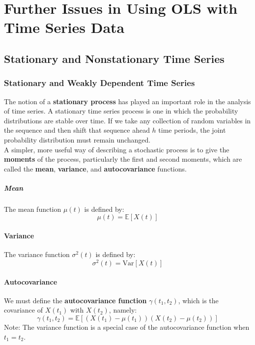 \documentclass[a4paper, 10pt]{article}
\theoremstyle{definition}	%
\begin{document}
\newpage

\section{Further Issues in Using OLS with Time Series Data}
\setcounter{equation}{0}
\setcounter{theorem}{0}
\setcounter{assumption}{0}

\subsection{Stationary and Nonstationary Time Series}
\subsubsection{Stationary and Weakly Dependent Time Series}
The notion of a \textbf{stationary process} has played an important role in the analysis of time series. A stationary time series process is one in which the probability distributions are stable over time. If we take any collection of random variables in the sequence and then shift that sequence ahead $h$ time periods, the joint probability distribution must remain unchanged.\\
A simpler, more useful way of describing a stochastic process is to give the \textbf{moments} of the process, particularly the first and second moments, which are called the \textbf{mean}, \textbf{variance}, and \textbf{autocovariance} functions.

\subparagraph{Mean} The mean function \( \mu(t) \) is defined by:
\begin{equation*}
    \mu(t) = \mathbb{E}[X(t)]
\end{equation*}

\paragraph{Variance}
The variance function \( \sigma^2(t) \) is defined by:
\[
\sigma^2(t) = \text{Var}[X(t)]
\]

\paragraph{Autocovariance}
We must define the \textbf{autocovariance function} \( \gamma(t_1, t_2) \), which is the covariance of \( X(t_1) \) with \( X(t_2) \), namely:
\[
\gamma(t_1, t_2) = \mathbb{E}\left[ (X(t_1) - \mu(t_1)) (X(t_2) - \mu(t_2)) \right]
\]
Note: The variance function is a special case of the autocovariance function when \( t_1 = t_2 \).
\end{document}
